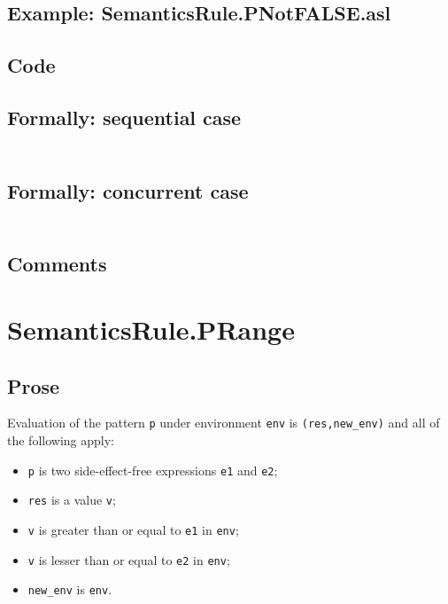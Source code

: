\documentclass{book}
\begin{document}
    \subsection{Example: SemanticsRule.PNotFALSE.asl}

  \subsection{Code}

  \subsection{Formally: sequential case}
  \begin{align}
  \end{align} 

  \subsection{Formally: concurrent case}
  \begin{align}
  \end{align} 

    \subsection{Comments}

\section{SemanticsRule.PRange \label{sec:SemanticsRule.PRange}}

    \subsection{Prose}
   Evaluation of the pattern \texttt{p} under environment \texttt{env} is
  \texttt{(res,new\_env)} and all of the following apply:
    \begin{itemize}
    \item \texttt{p} is two side-effect-free expressions \texttt{e1} and \texttt{e2};
    \item \texttt{res} is a value \texttt{v};
    \item \texttt{v} is greater than or equal to \texttt{e1} in \texttt{env};
    \item \texttt{v} is lesser than or equal to \texttt{e2} in \texttt{env};
    \item \texttt{new\_env} is \texttt{env}.
    \end{itemize}
\end{document}
